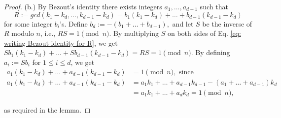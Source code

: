 \documentclass[10pt,a4paper]{amsart}
\begin{document}
\begin{proof}
(b.) By Bezout's identity there exists integers $a_1, \ldots, a_{d-1}$ such that 
\begin{equation}\label{eq: writing Bezout identity for R}
    R := gcd(k_1 - k_d, \ldots, k_{d-1} - k_d) = b_1(k_1 - k_{d}) + \ldots + b_{d-1} (k_{d-1} - k_d) 
\end{equation}
for some integer $b_i$'s.  Define $b_d := -(b_1 +\ldots + b_{d-1}),$ and let $S$ be the inverse of $R$ modulo $n$, i.e., $RS = 1 \pmod{n}$. By multiplying $S$ on both sides of Eq. \eqref{eq: writing Bezout identity for R}, we get $Sb_1(k_1 - k_{d}) + \ldots + Sb_{d-1} (k_{d-1} - k_d) = RS = 1 \pmod{n}$. By defining $a_i :=Sb_i$ for $1\leq i \leq d$, we get 
\begin{align}
    a_1(k_1 - k_{d}) + \ldots + a_{d-1} (k_{d-1} - k_d) &= 1 \pmod{n},  \, \,  \text{since}\\
     \nonumber a_1(k_1 - k_{d}) + \ldots + a_{d-1} (k_{d-1} - k_d) & = a_1k_1 + \ldots + a_{d-1}k_{d-1} - ( a_1 + \dots + a_{d-1})k_d \\
   \nonumber  & = a_1k_1 + \ldots + a_dk_d = 1 \pmod{n},
\end{align}

as required in the lemma. 
\end{proof}
\end{document}
